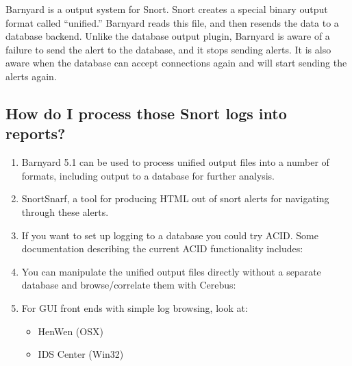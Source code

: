 \documentclass{article}
\begin{document}
Barnyard is a output system for Snort. Snort creates a special binary output
format called ``unified.'' Barnyard reads this file, and then resends the data
to a database backend. Unlike the database output plugin, Barnyard is aware of
a failure to send the alert to the database, and it stops sending alerts. It is
also aware when the database can accept connections again and will start
sending the alerts again.

\subsection{How do I process those Snort logs into reports?}
\begin{enumerate}
\item  Barnyard 5.1 can be used to process unified output files into a number of
    formats, including output to a database for further analysis.
\item  SnortSnarf, a tool for producing HTML out of snort alerts for navigating
    through these alerts.


\item  If you want to set up logging to a database you could try ACID. Some
    documentation describing the current ACID functionality includes:


\item  You can manipulate the unified output files directly without a separate
    database and browse/correlate them with Cerebus:


\item For GUI front ends with simple log browsing, look at:
    \begin{itemize}
      \item HenWen (OSX)



      \item IDS Center (Win32) \label{IDSCenter}


\end{itemize}
\end{enumerate}
\end{document}
